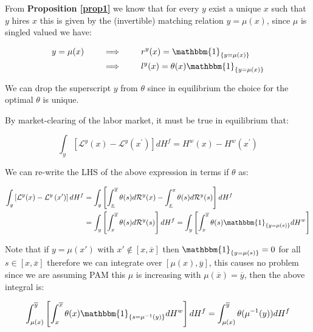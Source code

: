 \documentclass[12pt]{article}
\theoremstyle{definition}
\newcommand{\qiq}{\qquad \implies \qquad}
\begin{document}
From \textbf{Proposition \ref{prop1}} we know that for every $y$ exist a unique $x$ such that $y$ hires $x$ this is given by the (invertible) matching relation $y = \mu(x)$, since $\mu$ is singled valued we have:


\begin{align*}
    y = \mu(x)  &\qiq r^y(x) = \mathbbm{1}_{\{y=\mu(x)\}}\\
                &\qiq l^y(x) = \theta(x)\mathbbm{1}_{\{y=\mu(x)\}}
\end{align*}


We can drop the superscript $y$ from $\theta$ since in equilibrium the choice for the optimal $\theta$ is unique.

By market-clearing of the labor market, it must be true in equilibrium that:

\begin{equation}\label{mkt_clearing_eq}
\int_{y}\left[\mathcal{L}^{y}(x)-\mathcal{L}^{y}\left(x^{\prime}\right)\right] d H^{f} = H^{w}(x)-H^{w}\left(x^{\prime}\right)
\end{equation}

We can re-write the LHS of the above expression in terms if $\theta$ as:

\begin{align*}
    \int_{y}\left[\mathcal{L}^{y}(x)-\mathcal{L}^{y}\left(x^{\prime}\right)\right] d H^{f} &=  \int_{y}\left[ \int_{\underline{x}}^{\overline{x}}{\theta(s)d\mathcal{R}^y(x)} - \int_{\underline{x}}^{x}{\theta(s)d\mathcal{R}^y(s)} \right] d H^{f} \\
    &=  \int_{y}\left[ \int_{x}^{\overline{x}}{\theta(s)d\mathcal{R}^y(s)} \right] d H^{f} = \int_{y}\left[ \int_{x}^{\overline{x}}{\theta(s)\mathbbm{1}_{\{y=\mu(s)\}}dH^w} \right]
\end{align*}

Note that if $y=\mu(x')$ with $x'\not\in[x,\overline{x}]$ then $\mathbbm{1}_{\{y=\mu(s)\}} = 0$ for all $s\in[x,\overline{x}]$ therefore we can integrate over $[\mu(x), \overline{y}]$, this causes no problem since we are assuming PAM this $\mu$ is increasing with $\mu(\overline{x}) = \overline{y}$, then the above integral is:

\begin{align*}
    \int_{\mu(x)}^{\overline{y}}{ \left[ \int_{x}^{\overline{x}}{\theta(x)} \mathbbm{1}_{\{s=\mu^{-1}(y)\}}dH^w \right] dH^f } = \int_{\mu(x)}^{\overline{y}}{ \theta(\mu^{-1}(y)) dH^f } 
\end{align*}
\end{document}
